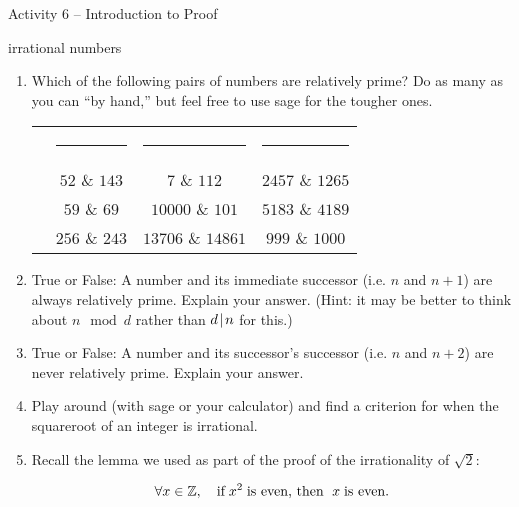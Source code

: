 \documentclass{amsart}
\begin{document}
\thispagestyle{empty}

\centerline{\Large Activity 6 -- Introduction to Proof}
\centerline{\large irrational numbers}

\bigskip
\Large


\begin{enumerate}
\item Which of the following pairs of numbers are relatively prime? Do as many as you can ``by hand,'' but feel free to use sage for the tougher ones.

\vspace{.1in}

\begin{tabular}{cccc}
 & \rule{72pt}{0pt} & \rule{72pt}{0pt} & \rule{72pt}{0pt} \\
\rule[-15pt]{0pt}{44pt} & $52$ \& $143$ &  $7$ \& $112$ & $2457$ \& $1265$\\
\rule[-15pt]{0pt}{44pt} & $59$ \& $69$ & $10000$ \& $101$ & $5183$ \& $4189$ \\
\rule[-15pt]{0pt}{44pt} & $256$ \& $243$ & $13706$ \& $14861$ & $999$ \& $1000$ \\
\end{tabular}

\rule{0pt}{0pt}

\vspace{.1in}

\rule{0pt}{0pt}

\item True or False: A number and its immediate successor (i.e. $n$ and $n+1$) are always relatively prime. Explain your answer. (Hint: it may be better to think about $n \mod d$ rather than $d\!\mid\! n$ for this.)

\vfill

\item True or False: A number and its successor's successor (i.e. $n$ and $n+2$) are never relatively prime. Explain your answer.

\vfill

\item Play around (with sage or your calculator) and find a criterion for when the squareroot of an integer is irrational.

\vfill

\newpage

\item Recall the lemma we used as part of the proof of the irrationality of $\sqrt{2}$:

\[ \forall x \in {\mathbb Z}, \quad \mbox{if} \; x^2 \; \mbox{is even, then } \; x \; \mbox{is even}. \]


\end{enumerate}
\end{document}
